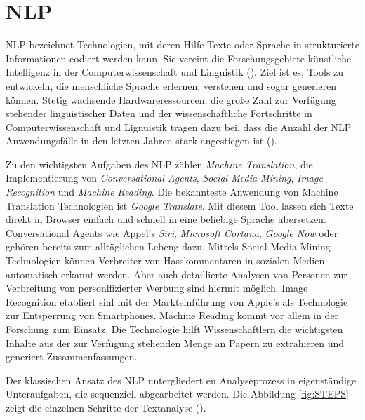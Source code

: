 \section{NLP}

\ac{NLP} bezeichnet Technologien, mit deren Hilfe Texte oder Sprache in strukturierte Informationen codiert werden kann. Sie vereint die Forschungsgebiete künstliche Intelligenz in der Computerwissenschaft und Linguistik (\cite[vgl.][1]{ITWISSEN}). Ziel ist es, Tools zu entwickeln, die menschliche Sprache erlernen, verstehen und sogar generieren können. Stetig wachsende Hardwareressourcen, die große Zahl zur Verfügung stehender linguistischer Daten und der wissenschaftliche Fortschritte in Computerwissenschaft und Lignuistik tragen dazu bei, dass die Anzahl der \ac{NLP} Anwendungsfälle in den letzten Jahren stark angestiegen ist (\cite[vgl.][1]{HIRSCHBERG}). 
\par
Zu den wichtigsten Aufgaben des \ac{NLP} zählen \textit{Machine Translation}, die Implementierung von \textit{Conversational Agents}, \textit{Social Media Mining}, \textit{Image Recognition} und \textit{Machine Reading}. Die bekannteste Anwendung  von Machine Translation Technologien ist \textit{Google Translate}. Mit diesem Tool lassen sich Texte direkt in Browser einfach und schnell in eine beliebige Sprache übersetzen. Conversational Agents wie Appel's\textit{ Siri}, \textit{Microsoft Cortana}, \textit{Google Now} oder  gehören bereits zum alltäglichen Lebeng dazu. Mittels Social Media Mining Technologien können Verbreiter von Hasskommentaren in sozialen Medien automatisch erkannt werden. Aber auch detaillierte Analysen von Personen zur Verbreitung von personifizierter Werbung sind hiermit möglich. Image Recognition etabliert sinf mit der Markteinführung von Apple's  als Technologie zur Entsperrung von Smartphones. Machine Reading kommt vor allem in der Forschung zum Einsatz. Die Technologie hilft Wissenschaftlern die wichtigsten Inhalte aus der zur Verfügung stehenden Menge an Papern zu extrahieren und generiert Zusammenfassungen.
\par
Der klassischen Ansatz des \ac{NLP} untergliedert en Analyseprozess in eigenständige Unteraufgaben, die sequenziell abgearbeitet werden. Die Abbildung \ref{fig:STEPS} zeigt die einzelnen Schritte der Textanalyse (\cite[vgl.][4]{DALE}). 
\par
